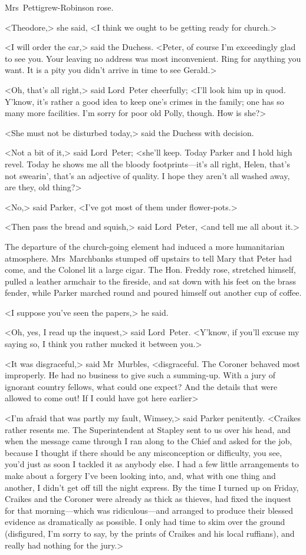 Mrs~Pettigrew-Robinson rose.

<Theodore,> she said, <I think we ought to be getting ready for church.>

<I will order the car,> said the Duchess. <Peter, of course I'm exceedingly glad to see you. Your leaving no address was most inconvenient. Ring for anything you want. It is a pity you didn't arrive in time to see Gerald.>

<Oh, that's all right,> said Lord~Peter cheerfully; <I'll look him up in quod. Y'know, it's rather a good idea to keep one's crimes in the family; one has so many more facilities. I'm sorry for poor old Polly, though. How is she?>

<She must not be disturbed today,> said the Duchess with decision.

<Not a bit of it,> said Lord~Peter; <she'll keep. Today Parker and I hold high revel. Today he shows me all the bloody footprints—it's all right, Helen, that's not swearin', that's an adjective of quality. I hope they aren't all washed away, are they, old thing?>

<No,> said Parker, <I've got most of them under flower-pots.>

<Then pass the bread and squish,> said Lord~Peter, <and tell me all about it.>

The departure of the church-going element had induced a more humanitarian atmosphere. Mrs~Marchbanks stumped off upstairs to tell Mary that Peter had come, and the Colonel lit a large cigar. The Hon.  Freddy rose, stretched himself, pulled a leather armchair to the fireside, and sat down with his feet on the brass fender, while Parker marched round and poured himself out another cup of coffee.

<I suppose you've seen the papers,> he said.

<Oh, yes, I read up the inquest,> said Lord~Peter. <Y'know, if you'll excuse my saying so, I think you rather mucked it between you.>

<It was disgraceful,> said Mr~Murbles, <disgraceful. The Coroner behaved most improperly. He had no business to give such a summing-up.  With a jury of ignorant country fellows, what could one expect? And the details that were allowed to come out! If I could have got here earlier\longdash>

<I'm afraid that was partly my fault, Wimsey,> said Parker penitently. <Craikes rather resents me. The Superintendent at Stapley sent to us over his head, and when the message came through I ran along to the Chief and asked for the job, because I thought if there should be any misconception or difficulty, you see, you'd just as soon I tackled it as anybody else. I had a few little arrangements to make about a forgery I've been looking into, and, what with one thing and another, I didn't get off till the night express. By the time I turned up on Friday, Craikes and the Coroner were already as thick as thieves, had fixed the inquest for that morning—which was ridiculous—and arranged to produce their blessed evidence as dramatically as possible. I only had time to skim over the ground (disfigured, I'm sorry to say, by the prints of Craikes and his local ruffians), and really had nothing for the jury.>

